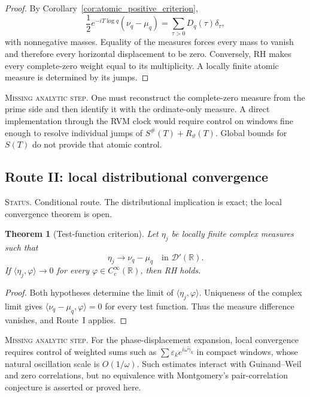 \documentclass[11pt]{amsart}
\numberwithin{equation}{section}
\theoremstyle{plain}
\newtheorem{theorem}{Theorem}[section]
\theoremstyle{definition}
\theoremstyle{remark}
\newcommand{\1}{\mathbf{1}}
\newcommand{\statusnote}[1]{%
  \par\smallskip\noindent
  \begingroup\footnotesize\textsc{Status.} #1\endgroup
  \par\smallskip}
\newcommand{\missingnote}[1]{%
  \par\smallskip\noindent
  \begingroup\footnotesize\textsc{Missing analytic step.} #1\endgroup
  \par\smallskip}
\begin{document}
\begin{proof}
By Corollary~\ref{cor:atomic_positive_criterion},
\begin{equation}
\frac12e^{-iT\log q}(\nu_q-\mu_q)
=
\sum_{\tau>0}D_q(\tau)\delta_\tau,
\label{eq:route_atomic_positive_measure}
\end{equation}
with nonnegative masses.  Equality of the measures forces every mass to
vanish and therefore every horizontal displacement to be zero.  Conversely,
RH makes every complete-zero weight equal to its multiplicity.  A locally
finite atomic measure is determined by its jumps.
\end{proof}

\missingnote{One must reconstruct the complete-zero measure from the prime side
and then identify it with the ordinate-only measure.  A direct implementation
through the RVM clock would require control on windows fine enough to resolve
individual jumps of $S^{\#}(T)+R_\vartheta(T)$.  Global bounds for $S(T)$ do
not provide that atomic control.}

\subsection{Route II: local distributional convergence}
\label{subsec:route_distributional}

\statusnote{Conditional route.  The distributional implication is exact; the local convergence theorem is open.}
\begin{theorem}[Test-function criterion]
\label{thm:test_function_criterion}
Let $\eta_j$ be locally finite complex measures such that
\begin{equation}
\eta_j\longrightarrow\nu_q-\mu_q
\quad\text{in }\mathcal D'(\mathbb R).
\label{eq:test_measure_identification}
\end{equation}
If $\langle\eta_j,\varphi\rangle\to0$ for every
$\varphi\in C_c^\infty(\mathbb R)$, then RH holds.
\end{theorem}

\begin{proof}
Both hypotheses determine the limit of
$\langle\eta_j,\varphi\rangle$.  Uniqueness of the complex limit gives
$\langle\nu_q-\mu_q,\varphi\rangle=0$ for every test function.  Thus the
measure difference vanishes, and Route~I applies.
\end{proof}

\missingnote{For the phase-displacement expansion, local convergence requires
control of weighted sums such as
$\sum\varepsilon_k e^{i\omega\widetilde\gamma_k}$ in compact windows,
whose natural oscillation scale is $O(1/\omega)$.  Such estimates interact
with Guinand--Weil and zero correlations, but no equivalence with
Montgomery's pair-correlation conjecture \cite{Montgomery1973} is asserted
or proved here.}
\end{document}
